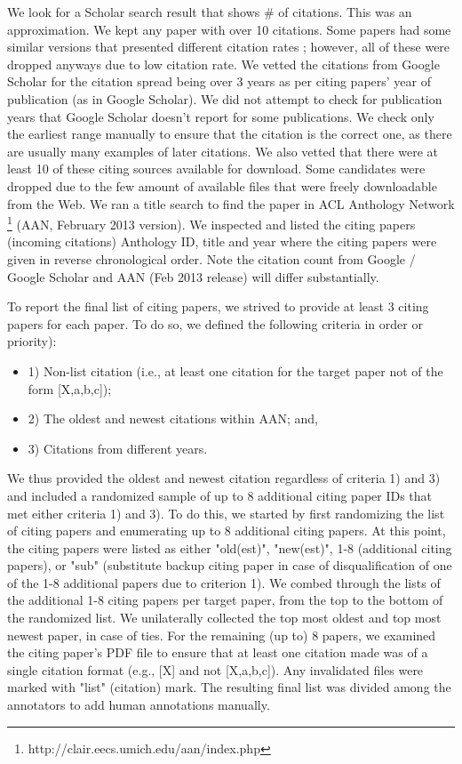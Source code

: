 \documentclass[11pt]{article}
\begin{document}
We look for a Scholar search result that shows \# of citations. This was an approximation. We kept any paper with over 10 citations. Some papers had some similar versions that presented different citation rates ; however, all of these were dropped anyways due to low citation rate.
We vetted the citations from Google Scholar for the citation spread being over 3 years as per citing papers' year of publication (as in Google Scholar). We did not attempt to check for publication years that Google Scholar doesn't report for some publications. We check only the earliest range manually to ensure that the citation is the correct one, as there are usually many examples of later citations. We also vetted that there were at least 10 of these citing sources available for download. Some candidates were dropped due to the few amount of available files that were freely downloadable from the Web.
We ran a title search to find the paper in ACL Anthology Network  \footnote{http://clair.eecs.umich.edu/aan/index.php}
(AAN, February 2013 version). We inspected and listed the citing papers (incoming citations) Anthology ID, title and year where the citing papers were given in reverse chronological order. Note the citation count from Google / Google Scholar and AAN (Feb 2013 release) will differ substantially.

To report the final list of citing papers, we strived to provide at least 3 citing papers for each paper. To do so, we defined the following criteria in order or priority): 
\begin{itemize}
\item 1) Non-list citation (i.e., at least one citation for the
target paper not of the form [X,a,b,c]); 
\item 2) The oldest and newest
citations within AAN; and, 
\item 3) Citations from different years. 
\end{itemize} 

We thus provided the oldest and newest citation regardless of criteria 1) and 3) and included a randomized sample of up to 8 additional citing paper IDs that met either criteria 1) and 3). To do this, we started by first randomizing the list of citing papers and enumerating up to 8 additional citing papers. At this point, the citing papers were listed as either "old(est)", "new(est)", 1-8 (additional citing papers),  or "sub" (substitute backup citing paper in case of disqualification of 
one of the 1-8 additional papers due to criterion 1). We combed through the lists of the additional 1-8 citing papers per
target paper, from the top to the bottom of the randomized list.  We unilaterally collected the top most oldest and top most
newest paper, in case of ties.  For the remaining (up to) 8 papers, we examined the citing paper's PDF file to ensure that at least one citation made was of a single citation format (e.g., [X] and not [X,a,b,c]). Any invalidated files were marked with "list" (citation) mark. The resulting final list was divided among the annotators to add human annotations manually.
\end{document}
